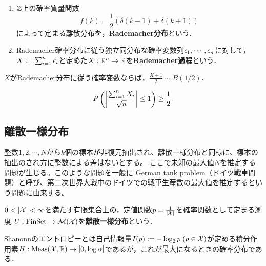 \documentclass[uplatex,dvipdfmx]{jsreport}
\begin{document}
\begin{definition}\mbox{}
    \begin{enumerate}
        \item $\mathbb{Z}$上の確率質量関数
        \[f(k)=\frac{1}{2}(\delta(k-1)+\delta(k+1))\]
        によって定まる離散分布を，\textbf{Rademacher分布}という．
        \item Rademacher確率分布に従う独立同分布な確率変数列$\epsilon_1,\cdots,\epsilon_n$に対して，$X:=\sum^n_{i=1}\epsilon_i$と定めた$X:\mathbb{R}^n\to\mathbb{R}$を\textbf{Rademacher過程}という．
    \end{enumerate}
\end{definition}
\begin{remark}
    $X$がRademacher分布に従う確率変数ならば，$\frac{X+1}{2}\sim B(1/2)$．
\end{remark}

\begin{proposition}
    \[P\left(\left|\frac{\sum^n_{i=1}X_i}{\sqrt{n}}\right|\le 1\right)\ge\frac{1}{2}.\]
\end{proposition}

\subsection{離散一様分布}

\begin{tcolorbox}[colframe=ForestGreen, colback=ForestGreen!10!white,breakable,colbacktitle=ForestGreen!40!white,coltitle=black,fonttitle=\bfseries\sffamily,
title=]
    整数$ 1, 2, \cdots, N$から$k$個の標本が非復元抽出され、離散一様分布と同様に、標本の抽出のされ方に整数による差はないとする。
    ここで未知の最大値$ N $を推定する問題が生じる。このような問題を一般に German tank problem（ドイツ戦車問題）と呼び、第二次世界大戦中のドイツでの戦車生産数の最大値を推定するという問題に由来する。 
\end{tcolorbox}

\begin{definition}
    $0<\lvert\mathcal{X}\rvert<\infty$を満たす有限集合上の，定値関数$p=\frac{1}{\lvert\mathcal{X}\rvert}$を確率関数として定まる測度
    $U:\mathrm{FinSet}\to\mathcal{M}(\mathcal{X})$を\textbf{離散一様分布}という．
\end{definition}
\begin{remarks}
    Shanonnのエントロピーとは自己情報量$I(p):=-\log_2p\;(p\in\mathcal{X})$が定める積分作用素$H:\mathrm{Meas}(\mathcal{X},\mathbb{R})\to[0,\log\alpha]$であるが，これが最大になるときの確率分布である．
\end{remarks}
\end{document}

